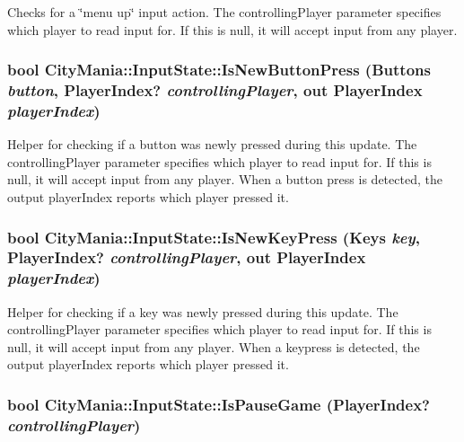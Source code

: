 Checks for a \char`\"{}menu up\char`\"{} input action. The controllingPlayer parameter specifies which player to read input for. If this is null, it will accept input from any player. \hypertarget{classCityMania_1_1InputState_ab3a3190e6785283cc286d86659957f61}{
\subsubsection[{IsNewButtonPress}]{\setlength{\rightskip}{0pt plus 5cm}bool CityMania::InputState::IsNewButtonPress (Buttons {\em button}, \/  PlayerIndex? {\em controllingPlayer}, \/  out PlayerIndex {\em playerIndex})}}
\label{classCityMania_1_1InputState_ab3a3190e6785283cc286d86659957f61}


Helper for checking if a button was newly pressed during this update. The controllingPlayer parameter specifies which player to read input for. If this is null, it will accept input from any player. When a button press is detected, the output playerIndex reports which player pressed it. \hypertarget{classCityMania_1_1InputState_a97898f622de8b21514a06de7a0b2e141}{
\subsubsection[{IsNewKeyPress}]{\setlength{\rightskip}{0pt plus 5cm}bool CityMania::InputState::IsNewKeyPress (Keys {\em key}, \/  PlayerIndex? {\em controllingPlayer}, \/  out PlayerIndex {\em playerIndex})}}
\label{classCityMania_1_1InputState_a97898f622de8b21514a06de7a0b2e141}


Helper for checking if a key was newly pressed during this update. The controllingPlayer parameter specifies which player to read input for. If this is null, it will accept input from any player. When a keypress is detected, the output playerIndex reports which player pressed it. \hypertarget{classCityMania_1_1InputState_a3bd8bfe8eb38e6a6730104b22965a752}{
\subsubsection[{IsPauseGame}]{\setlength{\rightskip}{0pt plus 5cm}bool CityMania::InputState::IsPauseGame (PlayerIndex? {\em controllingPlayer})}}
\label{classCityMania_1_1InputState_a3bd8bfe8eb38e6a6730104b22965a752}


